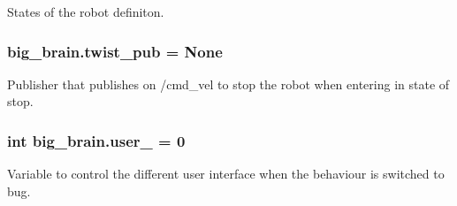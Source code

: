 States of the robot definiton. 

\subsubsection[{\texorpdfstring{twist\+\_\+pub}{twist_pub}}]{\setlength{\rightskip}{0pt plus 5cm}big\+\_\+brain.\+twist\+\_\+pub = None}\hypertarget{namespacebig__brain_a9f12d1c3982160fe18122c7a2c4aa860}{}\label{namespacebig__brain_a9f12d1c3982160fe18122c7a2c4aa860}


Publisher that publishes on /cmd\+\_\+vel to stop the robot when entering in state of \textquotesingle{}stop\textquotesingle{}. 

\subsubsection[{\texorpdfstring{user\+\_\+}{user_}}]{\setlength{\rightskip}{0pt plus 5cm}int big\+\_\+brain.\+user\+\_\+ = 0}\hypertarget{namespacebig__brain_a82350019fe3047e74222abd0d6b07c14}{}\label{namespacebig__brain_a82350019fe3047e74222abd0d6b07c14}


Variable to control the different user interface when the behaviour is switched to bug. 

